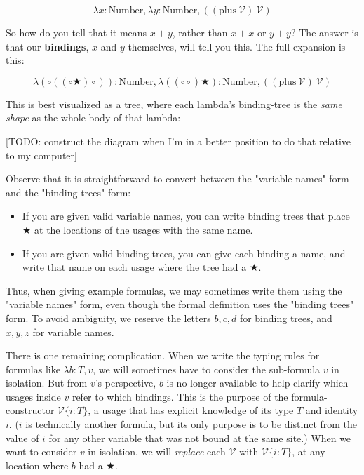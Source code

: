\documentclass{article}
\newcommand{\usage}{\mathcal{V}}
\newcommand{\usageKnown}[2]{\usage\{#2:#1\}}
\newcommand{\bindvariable}{\bigstar}
\newcommand{\bindnotthis}{\circ}
\begin{document}
  \[ \lambda x : \mathrm{Number}, \lambda y : \mathrm{Number}, ((\mathrm{plus}\ \usage)\ \usage) \]
  
  So how do you tell that it means $x + y$, rather than $x + x$ or $y + y$? The answer is that our \textbf{bindings}, $x$ and $y$ themselves, will tell you this. The full expansion is this:
  
  \[ \lambda (\bindnotthis((\bindnotthis \bindvariable) \bindnotthis)) : \mathrm{Number}, \lambda ((\bindnotthis \bindnotthis) \bindvariable) : \mathrm{Number}, ((\mathrm{plus}\ \usage)\ \usage) \]
  
  This is best visualized as a tree, where each lambda's binding-tree is the \emph{same shape} as the whole body of that lambda:
  
  [TODO: construct the diagram when I'm in a better position to do that relative to my computer]
  
  Observe that it is straightforward to convert between the "variable names" form and the "binding trees" form:
  \begin{itemize}
    \item If you are given valid variable names, you can write binding trees that place $\bindvariable$ at the locations of the usages with the same name.
    \item If you are given valid binding trees, you can give each binding a name, and write that name on each usage where the tree had a $\bindvariable$.
  \end{itemize}
  
  Thus, when giving example formulas, we may sometimes write them using the "variable names" form, even though the formal definition uses the "binding trees" form. To avoid ambiguity, we reserve the letters $b,c,d$ for binding trees, and $x,y,z$ for variable names.
  
  There is one remaining complication. When we write the typing rules for formulas like $\lambda b:T,v$, we will sometimes have to consider the sub-formula $v$ in isolation. But from $v$'s perspective, $b$ is no longer available to help clarify which usages inside $v$ refer to which bindings. This is the purpose of the formula-constructor $\usageKnown{T}{i}$, a usage that has explicit knowledge of its type $T$ and identity $i$. ($i$ is technically another formula, but its only purpose is to be distinct from the value of $i$ for any other variable that was not bound at the same site.) When we want to consider $v$ in isolation, we will \emph{replace} each $\usage$ with $\usageKnown{T}{i}$, at any location where $b$ had a $\bindvariable$.\\
  
\end{document}
